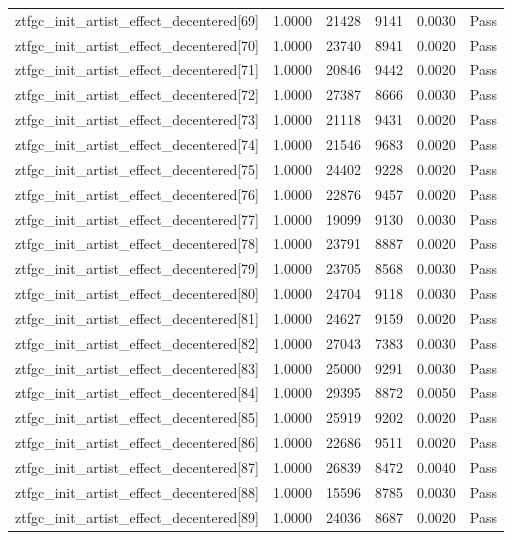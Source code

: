 \begin{table}[htbp]
\begin{tabular}{llrrll}
ztfgc\_init\_artist\_effect\_decentered[69] & 1.0000 & 21428 & 9141 & 0.0030 & Pass \\
ztfgc\_init\_artist\_effect\_decentered[70] & 1.0000 & 23740 & 8941 & 0.0020 & Pass \\
ztfgc\_init\_artist\_effect\_decentered[71] & 1.0000 & 20846 & 9442 & 0.0020 & Pass \\
ztfgc\_init\_artist\_effect\_decentered[72] & 1.0000 & 27387 & 8666 & 0.0030 & Pass \\
ztfgc\_init\_artist\_effect\_decentered[73] & 1.0000 & 21118 & 9431 & 0.0020 & Pass \\
ztfgc\_init\_artist\_effect\_decentered[74] & 1.0000 & 21546 & 9683 & 0.0020 & Pass \\
ztfgc\_init\_artist\_effect\_decentered[75] & 1.0000 & 24402 & 9228 & 0.0020 & Pass \\
ztfgc\_init\_artist\_effect\_decentered[76] & 1.0000 & 22876 & 9457 & 0.0020 & Pass \\
ztfgc\_init\_artist\_effect\_decentered[77] & 1.0000 & 19099 & 9130 & 0.0030 & Pass \\
ztfgc\_init\_artist\_effect\_decentered[78] & 1.0000 & 23791 & 8887 & 0.0020 & Pass \\
ztfgc\_init\_artist\_effect\_decentered[79] & 1.0000 & 23705 & 8568 & 0.0030 & Pass \\
ztfgc\_init\_artist\_effect\_decentered[80] & 1.0000 & 24704 & 9118 & 0.0030 & Pass \\
ztfgc\_init\_artist\_effect\_decentered[81] & 1.0000 & 24627 & 9159 & 0.0020 & Pass \\
ztfgc\_init\_artist\_effect\_decentered[82] & 1.0000 & 27043 & 7383 & 0.0030 & Pass \\
ztfgc\_init\_artist\_effect\_decentered[83] & 1.0000 & 25000 & 9291 & 0.0030 & Pass \\
ztfgc\_init\_artist\_effect\_decentered[84] & 1.0000 & 29395 & 8872 & 0.0050 & Pass \\
ztfgc\_init\_artist\_effect\_decentered[85] & 1.0000 & 25919 & 9202 & 0.0020 & Pass \\
ztfgc\_init\_artist\_effect\_decentered[86] & 1.0000 & 22686 & 9511 & 0.0020 & Pass \\
ztfgc\_init\_artist\_effect\_decentered[87] & 1.0000 & 26839 & 8472 & 0.0040 & Pass \\
ztfgc\_init\_artist\_effect\_decentered[88] & 1.0000 & 15596 & 8785 & 0.0030 & Pass \\
ztfgc\_init\_artist\_effect\_decentered[89] & 1.0000 & 24036 & 8687 & 0.0020 & Pass \\

\end{tabular}
\end{table}
